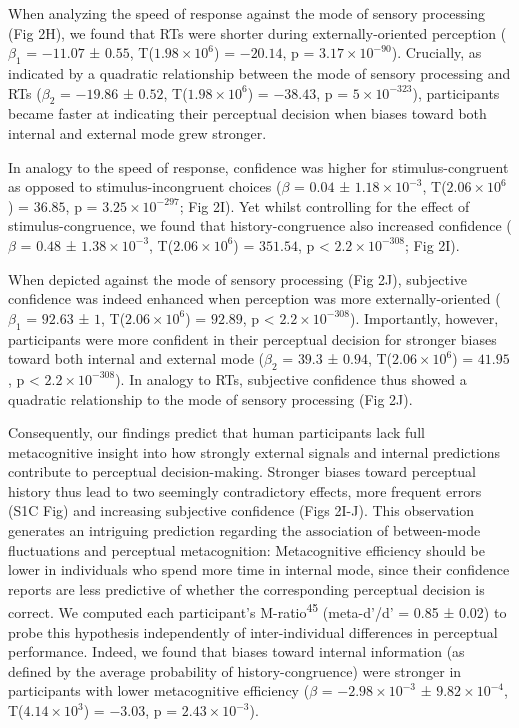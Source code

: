\documentclass[
]{article}
\begin{document}
When analyzing the speed of response against the mode of sensory
processing (Fig 2H), we found that RTs were shorter during
externally-oriented perception (\(\beta_1\) = \(-11.07\) ± \(0.55\),
T(\(\ensuremath{1.98\times 10^{6}}\)) = \(-20.14\), p =
\(\ensuremath{3.17\times 10^{-90}}\)). Crucially, as indicated by a
quadratic relationship between the mode of sensory processing and RTs
(\(\beta_2\) = \(-19.86\) ± \(0.52\),
T(\(\ensuremath{1.98\times 10^{6}}\)) = \(-38.43\), p =
\(\ensuremath{5\times 10^{-323}}\)), participants became faster at
indicating their perceptual decision when biases toward both internal
and external mode grew stronger.

In analogy to the speed of response, confidence was higher for
stimulus-congruent as opposed to stimulus-incongruent choices (\(\beta\)
= \(0.04\) ± \(\ensuremath{1.18\times 10^{-3}}\),
T(\(\ensuremath{2.06\times 10^{6}}\)) = \(36.85\), p =
\(\ensuremath{3.25\times 10^{-297}}\); Fig 2I). Yet whilst
controlling for the effect of stimulus-congruence, we found that
history-congruence also increased confidence (\(\beta\) = \(0.48\) ±
\(\ensuremath{1.38\times 10^{-3}}\),
T(\(\ensuremath{2.06\times 10^{6}}\)) = \(351.54\), p < \(\ensuremath{2.2\times 10^{-308}}\); Fig
2I).

When depicted against the mode of sensory processing (Fig 2J),
subjective confidence was indeed enhanced when perception was more
externally-oriented (\(\beta_1\) = \(92.63\) ± \(1\),
T(\(\ensuremath{2.06\times 10^{6}}\)) = \(92.89\), p < \(\ensuremath{2.2\times 10^{-308}}\)).
Importantly, however, participants were more confident in their
perceptual decision for stronger biases toward both internal and
external mode (\(\beta_2\) = \(39.3\) ± \(0.94\),
T(\(\ensuremath{2.06\times 10^{6}}\)) = \(41.95\), p < \(\ensuremath{2.2\times 10^{-308}}\)). In
analogy to RTs, subjective confidence thus showed a quadratic
relationship to the mode of sensory processing (Fig 2J).

Consequently, our findings predict that human participants lack full
metacognitive insight into how strongly external signals and internal
predictions contribute to perceptual decision-making. Stronger biases
toward perceptual history thus lead to two seemingly contradictory
effects, more frequent errors (S1C Fig) and increasing
subjective confidence (Figs 2I-J). This observation generates an
intriguing prediction regarding the association of between-mode
fluctuations and perceptual metacognition: Metacognitive efficiency
should be lower in individuals who spend more time in internal mode,
since their confidence reports are less predictive of whether the
corresponding perceptual decision is correct. We computed each
participant's M-ratio\textsuperscript{45} (meta-d'/d' = 0.85 ± 0.02) to
probe this hypothesis independently of inter-individual differences in
perceptual performance. Indeed, we found that biases toward internal
information (as defined by the average probability of
history-congruence) were stronger in participants with lower
metacognitive efficiency (\(\beta\) =
\(\ensuremath{-2.98\times 10^{-3}}\) ±
\(\ensuremath{9.82\times 10^{-4}}\),
T(\(\ensuremath{4.14\times 10^{3}}\)) = \(-3.03\), p =
\(\ensuremath{2.43\times 10^{-3}}\)).
\end{document}
